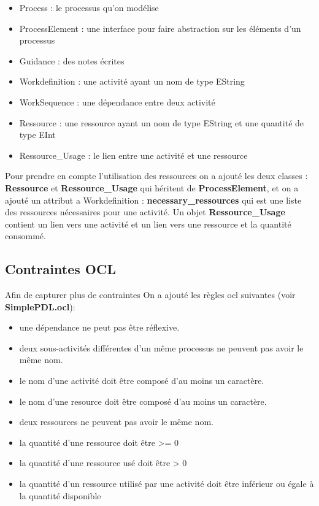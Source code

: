 \documentclass{article}
\begin{document}
\begin{itemize}
    \item Process : le processus qu'on modélise
    \item ProcessElement : une interface pour faire abstraction sur les éléments d'un processus
    \item Guidance : des notes écrites
    \item Workdefinition : une activité ayant un nom de type EString
    \item WorkSequence : une dépendance entre deux activité
    \item Ressource : une ressource ayant un nom de type EString et une quantité de type EInt
    \item Ressource\_Usage : le lien entre une activité et une ressource
\end{itemize}

Pour prendre en compte l'utilisation des ressources on a ajouté les deux classes : \textbf{Ressource} et \textbf{Ressource\_Usage}
qui héritent de \textbf{ProcessElement}, et on a ajouté un attribut a Workdefinition : \textbf{necessary\_ressources} qui est une liste 
des ressources nécessaires pour une activité. Un objet \textbf{Ressource\_Usage} contient un lien vers une activité et un lien vers 
une ressource et la quantité consommé.

\subsection{Contraintes OCL}
Afin de capturer plus de contraintes On a ajouté les règles ocl suivantes (voir \textbf{SimplePDL.ocl}):
\begin{itemize}
    \item une dépendance ne peut pas être réflexive.
    \item deux sous-activités différentes d’un même processus ne peuvent pas avoir le même nom.
    \item le nom d’une activité doit être composé d’au moins un caractère.
    \item le nom d’une resource doit être composé d’au moins un caractère.
    \item deux ressources ne peuvent pas avoir le même nom.
    \item la quantité d'une ressource doit être >= 0
    \item la quantité d'une ressource usé doit être > 0
    \item la quantité d'un ressource utilisé par une activité doit être inférieur ou égale à la quantité disponible
\end{itemize}
\end{document}
